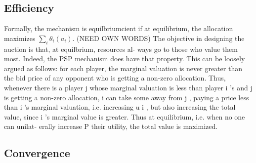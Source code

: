 \documentclass[sigconf, anonymous]{acmart}
\theoremstyle{definition}
\begin{document}
\subsection{Efficiency}

Formally, the
mechanism is equilbriumcient if at equilibrium, the allocation maximizes
$\sum_i\theta_i(a_i)$.
(NEED OWN WORDS)
The objective in designing the auction is that, at equilbrium, resources al-
ways go to those who value them most. Indeed, the PSP mechanism does
have that property. This can be loosely argued as follows: for each player,
the marginal valuation is never greater than the bid price of any opponent
who is getting a non-zero allocation. Thus, whenever there is a player j
whose marginal valuation is less than player i 's and j is getting a non-zero
allocation, i can take some away from j , paying a price less than i 's marginal
valuation, i.e. increasing u i , but also increasing the total value, since i 's
marginal value is greater. Thus at equilibrium, i.e. when no one can unilat-
erally increase P their utility, the total value is maximized.

\subsection{Convergence}

\end{document}
